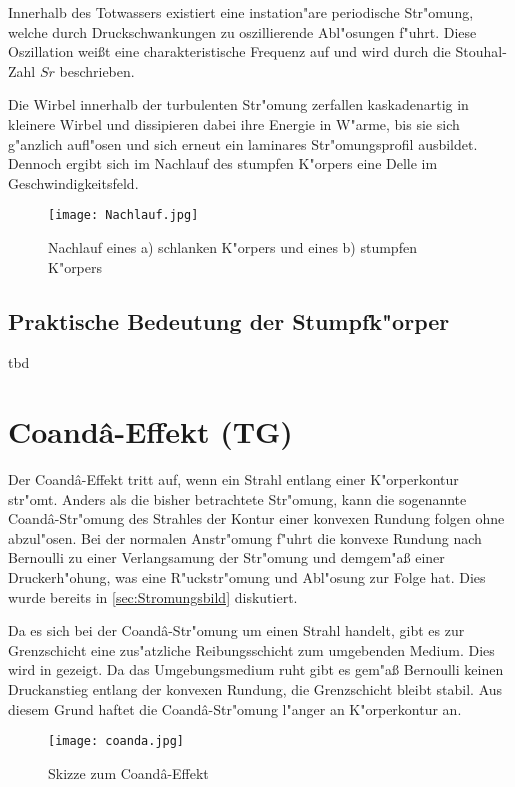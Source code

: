 Innerhalb des Totwassers existiert eine instation"are periodische Str"omung, welche durch Druckschwankungen zu oszillierende Abl"osungen f"uhrt. Diese Oszillation wei\ss{}t eine charakteristische Frequenz auf und wird durch die Stouhal-Zahl ${Sr}$ beschrieben. 

Die Wirbel innerhalb der turbulenten Str"omung  zerfallen kaskadenartig in kleinere Wirbel und dissipieren dabei ihre Energie in W"arme, bis sie sich g"anzlich aufl"osen und sich erneut ein laminares Str"omungsprofil ausbildet. Dennoch ergibt sich im Nachlauf des stumpfen K"orpers eine Delle im Geschwindigkeitsfeld. 

\begin{figure}[h]
	\centering
	\texttt{[image: Nachlauf.jpg]}
	\caption{Nachlauf eines a) schlanken K"orpers und eines b) stumpfen K"orpers \cite{Hucho.2011}}
	\label{fig:Nachlauf}
\end{figure}

\subsection{Praktische Bedeutung der Stumpfk"orper}
tbd


\section{Coand\^{a}-Effekt (TG)}

Der Coand\^{a}-Effekt tritt auf, wenn ein Strahl entlang einer K"orperkontur str"omt. Anders als die bisher betrachtete Str"omung, kann die sogenannte Coand\^{a}-Str"omung des Strahles der Kontur einer konvexen Rundung folgen ohne abzul"osen. Bei der normalen Anstr"omung f"uhrt die konvexe Rundung nach Bernoulli zu einer Verlangsamung der Str"omung und demgem"a\ss{} einer Druckerh"ohung, was eine R"uckstr"omung und Abl"osung zur Folge hat. Dies wurde bereits in \ref{sec:Stromungsbild} diskutiert.

Da es sich bei der Coand\^{a}-Str"omung um einen Strahl handelt, gibt es zur Grenzschicht eine zus"atzliche Reibungsschicht zum umgebenden Medium. Dies wird in  gezeigt. Da das Umgebungsmedium ruht gibt es gem"a\ss{} Bernoulli keinen Druckanstieg entlang der konvexen Rundung, die Grenzschicht bleibt stabil. Aus diesem Grund haftet die Coand\^{a}-Str"omung l"anger an K"orperkontur an.

\begin{figure}[h]
	\centering
	\texttt{[image: coanda.jpg]}
	\caption{Skizze zum Coand\^{a}-Effekt \cite{Stadlberger.2016}}
	\label{fig:coanda}
\end{figure}





